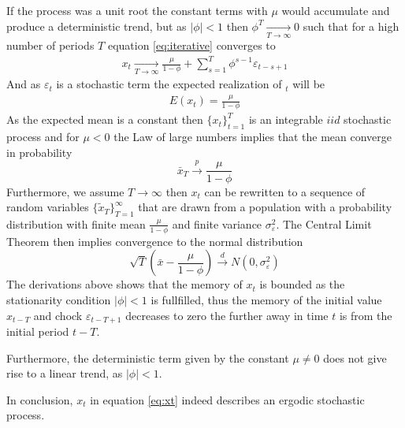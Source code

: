 If the process was a unit root the constant terms with $\mu$ would accumulate and produce a deterministic trend, but as $|\phi|<1$ then $\phi^T\xrightarrow[T\rightarrow\infty]{}0$ such that for a high number of periods $T$ equation \ref{eq:iterative} converges to
\begin{equation}
  \begin{split}
    x_t \xrightarrow[T\rightarrow\infty]{} \frac{\mu}{1-\phi} + \sum_{s=1}^T \phi^{s-1}\varepsilon_{t-s+1}
  \end{split}
\end{equation}
And as $\varepsilon_t$ is a stochastic term the expected realization of $_t$ will be
\begin{equation}
  \begin{split}
    E(x_t) = \frac{\mu}{1-\phi}
    \label{eq:mean}
  \end{split}
\end{equation}
As the expected mean is a constant then $\{x_t\}_{t=1}^T$ is an integrable $iid$ stochastic process and for $\mu<0$ the Law of large numbers implies that the mean converge in probability
\begin{equation}
  \bar{x}_T\xrightarrow{p}\frac{\mu}{1-\phi}
\end{equation}
Furthermore, we assume $T\rightarrow\infty$ then $x_t$ can be rewritten to a sequence of random variables $\{\tilde{x}_T\}_{T=1}^\infty$ that are drawn   from a population with a probability distribution with finite mean $\frac{\mu}{1-\phi}$ and finite variance $\sigma_\varepsilon^2$. The Central Limit Theorem then implies convergence to the normal distribution
\begin{equation}
  \sqrt{T}\left(\bar{x}-\frac{\mu}{1-\phi}\right) \xrightarrow{d}N(0,\sigma_\varepsilon^2)
\end{equation}
The derivations above shows that the memory of $x_t$ is bounded as the stationarity condition $|\phi|<1$ is fullfilled, thus the memory of the initial value $x_{t-T}$ and chock $\varepsilon_{t-T+1}$ decreases to zero the further away in time $t$ is from the initial period $t-T$.

Furthermore, the deterministic term given by the constant $\mu\neq0$ does not give rise to a linear trend, as $|\phi|<1$.

In conclusion, $x_t$ in equation \ref{eq:xt} indeed describes an ergodic stochastic process.

